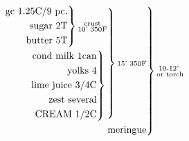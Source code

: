 \documentclass[12pt]{standalone}
\begin{document}
\[
\begin{rcases}\begin{alignedat}{3}
\begin{rcases}\begin{alignedat}{3}
\begin{rcases}\begin{alignedat}{3}
\text{gc 1.25C/9 pc.}\\
\text{sugar 2T}\\
\text{butter 5T}\\
\end{alignedat}\end{rcases}
\substack{\text{crust}\\\text{10' 350F}}\\
\begin{rcases}\begin{alignedat}{3}
\text{cond milk 1can}\\
\text{yolks 4}\\
\text{lime juice 3/4C}\\
\text{zest several}\\
\text{CREAM 1/2C}\\
\end{alignedat}\end{rcases}
\substack{\text{}}\\
\end{alignedat}\end{rcases}
\substack{\text{15' 350F}}\\
\text{meringue}\\
\end{alignedat}\end{rcases}
\substack{\text{10-12' }\\\text{or torch}}\\
\]
\end{document}
